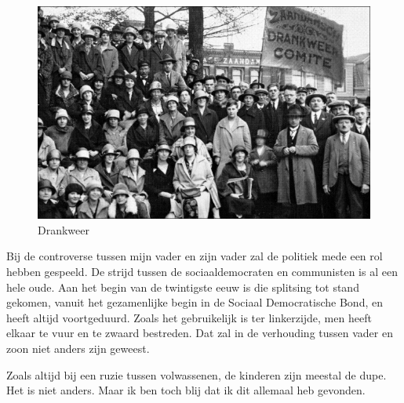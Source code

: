 \documentclass[10pt,twoside, openright]{memoir}
\begin{document}
\begin{figure}
\includegraphics[width=\textwidth]{img/ch2/ch2-afb06}
\caption*{\footnotesize Drankweer}
\end{figure}











Bij de controverse tussen mijn vader en zijn vader zal de politiek mede een rol hebben gespeeld. De strijd tussen de sociaaldemocraten en communisten is al een hele oude. Aan het begin van de twintigste eeuw is die splitsing tot stand gekomen, vanuit het gezamenlijke begin in de Sociaal Democratische Bond, en heeft altijd voortgeduurd. Zoals het gebruikelijk is ter linkerzijde, men heeft elkaar te vuur en te zwaard bestreden. Dat zal in de verhouding tussen vader en zoon niet anders zijn geweest. 

Zoals altijd bij een ruzie tussen volwassenen, de kinderen zijn meestal de dupe. Het is niet anders. Maar ik ben toch blij dat ik dit allemaal heb gevonden.
\end{document}

